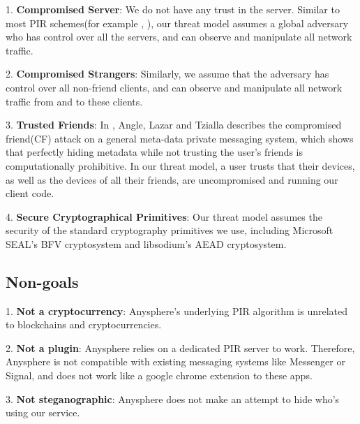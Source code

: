 


1. \textbf{Compromised Server}: We do not have any trust in the server. Similar to most PIR schemes(for example \cite{ahmad2021addra}, ), our threat model assumes a global adversary who has control over all the servers, and can observe and manipulate all network traffic.

2. \textbf{Compromised Strangers}: Similarly, we assume that the adversary has control over all non-friend clients, and can observe and manipulate all network traffic from and to these clients.

3. \textbf{Trusted Friends}: In \cite{angel2018s}, Angle, Lazar and Tzialla describes the compromised friend(CF) attack on a general meta-data private messaging system, which shows that perfectly hiding metadata while not trusting the user's friends is computationally prohibitive. In our threat model, a user trusts that their devices, as well as the devices of all their friends, are uncompromised and running our client code.  

4. \textbf{Secure Cryptographical Primitives}: Our threat model assumes the security of the standard cryptography primitives we use, including Microsoft SEAL's BFV cryptosystem and libsodium's AEAD cryptosystem. 



\subsection{Non-goals}
1. \textbf{Not a cryptocurrency}: Anysphere's underlying PIR algorithm is unrelated to blockchains and cryptocurrencies. 

2. \textbf{Not a plugin}: Anysphere relies on a dedicated PIR server to work. Therefore, Anysphere is not compatible with existing messaging systems like Messenger or Signal, and does not work like a google chrome extension to these apps. 

3. \textbf{Not steganographic}: Anysphere does not make an attempt to hide who's using our service.  

